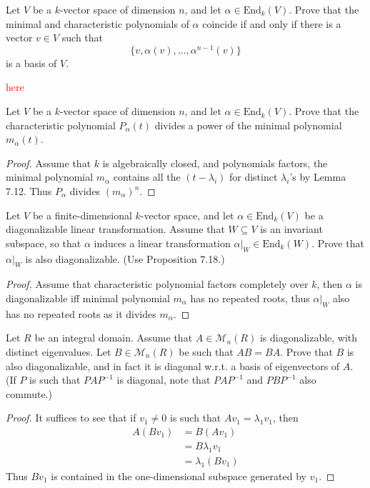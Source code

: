\documentclass[openany]{book}
\begin{document}
\begin{prob}[7.7]
    Let \( V \) be a \( k \)-vector space of dimension \( n \), and let \( \alpha \in \text{End}_k(V) \). Prove that the minimal and characteristic polynomials of \( \alpha \) coincide if and only if there is a vector \( v \in V \) such that  
    \[ \{v, \alpha(v), \dots, \alpha^{n-1}(v)\} \] 
is a basis of \( V \).
\end{prob}
\textcolor{red}{here}



\begin{prob}[7.8]
    Let \( V \) be a \( k \)-vector space of dimension \( n \), and let \( \alpha \in \text{End}_k(V) \). Prove that the characteristic polynomial \( P_\alpha(t) \) divides a power of the minimal polynomial \( m_\alpha(t) \).
\end{prob}
\begin{proof}
    Assume that $k$ is algebraically closed, and polynomials factors, the minimal polynomial $m_\alpha$ contains all the $(t-\lambda_i)$ for distinct $\lambda_i$'s by Lemma 7.12. Thus $P_\alpha$ divides $(m_\alpha)^n$.
\end{proof}

\begin{prob}[7.12]
    Let \( V \) be a finite-dimensional \( k \)-vector space, and let \( \alpha \in \text{End}_k(V) \) be a diagonalizable linear transformation. Assume that \( W \subseteq V \) is an invariant subspace, so that \( \alpha \) induces a linear transformation \( \alpha|_W \in \text{End}_k(W) \). Prove that \( \alpha|_W \) is also diagonalizable. (Use Proposition 7.18.)
\end{prob}
\begin{proof}
    Assume that characteristic polynomial factors completely over $k$, then $\alpha$ is diagonalizable iff minimal polynomial $m_\alpha$ has no repeated roots, thus $\alpha\vert_W$ also has no repeated roots as it divides $m_\alpha$.
\end{proof}


\begin{prob}[7.13]
    Let \( R \) be an integral domain. Assume that \( A \in \mathcal{M}_n(R) \) is diagonalizable, with distinct eigenvalues. Let \( B \in \mathcal{M}_n(R) \) be such that \( AB = BA \). Prove that \( B \) is also diagonalizable, and in fact it is diagonal w.r.t. a basis of eigenvectors of \( A \). (If \( P \) is such that \( PAP^{-1} \) is diagonal, note that \( PAP^{-1} \) and \( PBP^{-1} \) also commute.)
\end{prob}
\begin{proof}
    It suffices to see that if $v_1\neq 0$ is such that $Av_1=\lambda_1v_1$, then
    \begin{align*}
        A(Bv_1)&=B(Av_1)\\
        &=B\lambda_1v_1\\
        &=\lambda_1(Bv_1)
    \end{align*}
    Thus $Bv_1$ is contained in the one-dimensional subspace generated by $v_1$.
\end{proof}
\end{document}
